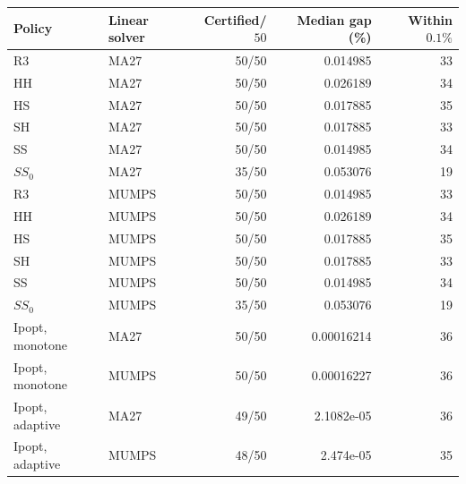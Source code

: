 \begin{tabular}{@{}llrrr@{}}
\toprule
Policy & Linear solver & Certified/$50$ & Median gap (\%) & Within $0.1\%$\\
\midrule
R3 & MA27 & 50/50 & 0.014985 & 33\\
HH & MA27 & 50/50 & 0.026189 & 34\\
HS & MA27 & 50/50 & 0.017885 & 35\\
SH & MA27 & 50/50 & 0.017885 & 33\\
SS & MA27 & 50/50 & 0.014985 & 34\\
$SS_0$ & MA27 & 35/50 & 0.053076 & 19\\
R3 & MUMPS & 50/50 & 0.014985 & 33\\
HH & MUMPS & 50/50 & 0.026189 & 34\\
HS & MUMPS & 50/50 & 0.017885 & 35\\
SH & MUMPS & 50/50 & 0.017885 & 33\\
SS & MUMPS & 50/50 & 0.014985 & 34\\
$SS_0$ & MUMPS & 35/50 & 0.053076 & 19\\
Ipopt, monotone & MA27 & 50/50 & 0.00016214 & 36\\
Ipopt, monotone & MUMPS & 50/50 & 0.00016227 & 36\\
Ipopt, adaptive & MA27 & 49/50 & 2.1082e-05 & 36\\
Ipopt, adaptive & MUMPS & 48/50 & 2.474e-05 & 35\\
\bottomrule
\end{tabular}
